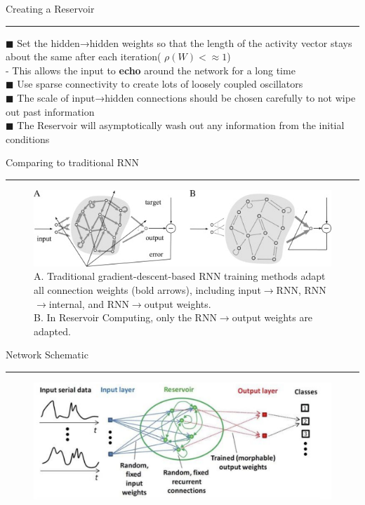 \documentclass[c,compress]{beamer}
\def\bsq{\color{blue(pigment)} $\blacksquare$ \color{black}}
\begin{document}
\begin{frame}{Creating a Reservoir\\\rule{10.5cm}{0.5pt}} \label{EchoState}
\bsq Set the hidden→hidden weights so that the length of the activity vector stays about the same after each iteration( $\rho(W) <\approx 1$)\\
    - This allows the input to \textbf{echo} around the network for a long time\\
\bsq Use sparse connectivity to create lots of loosely coupled oscillators\\
\bsq The scale of input→hidden connections should be chosen carefully to not wipe out past information\\
\bsq The Reservoir will asymptotically wash out any information from the initial conditions\\
\end{frame}


\begin{frame}{Comparing to traditional RNN\\\rule{10.5cm}{0.5pt}} \label{slide4}
\begin{figure}
    \centering
    \includegraphics[width=0.95\paperwidth]{RNN_ESN.png}
    {A. Traditional gradient-descent-based RNN training methods adapt all connection weights (bold arrows), including input$\rightarrow$RNN, RNN$\rightarrow$internal, and RNN$\rightarrow$output weights. \\B. In Reservoir Computing, only the RNN$\rightarrow$output weights are adapted.}
    \label{fig:my_label}
\end{figure}
\end{frame}

\begin{frame}{Network Schematic\\\rule{10.5cm}{0.5pt}} \label{slide7}
\begin{figure}
    \centering
    \includegraphics[width=0.95\linewidth]{training.png}
    \label{fig:amazon}
\end{figure}

\end{frame}
\end{document}
